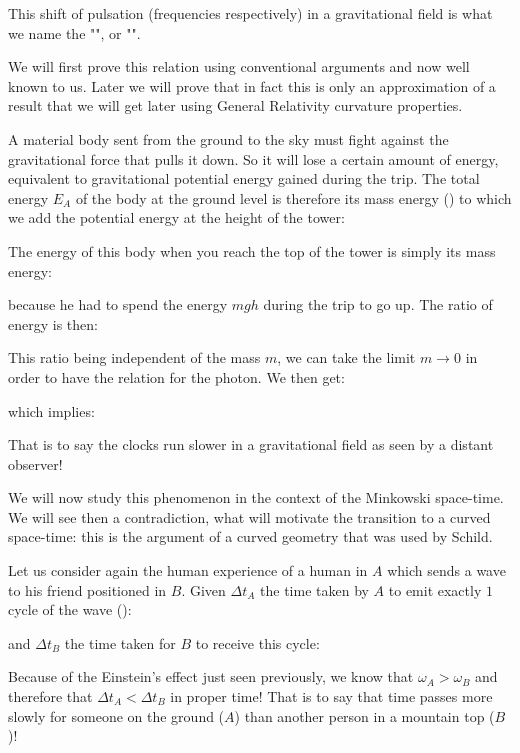 	This shift of pulsation (frequencies respectively) in a gravitational field is what we name the "", or "".
	
	We will first prove this relation using conventional arguments and now well known to us. Later we will prove that in fact this is only an approximation of a result that we will get later using General Relativity curvature properties.
	
	A material body sent from the ground to the sky must fight against the gravitational force that pulls it down. So it will lose a certain amount of energy, equivalent to gravitational potential energy gained during the trip. The total energy $E_A$ of the body at the ground level is therefore its mass energy () to which we add the potential energy at the height of the tower:
	
	The energy of this body when you reach the top of the tower is simply its mass energy:
	
	because he had to spend the energy $mgh$ during the trip to go up. The ratio of energy is then:
	
	This ratio being independent of the mass $m$, we can take the limit $m\rightarrow 0$ in order to have the relation for the photon. We then get:
	
	which implies:
	
	That is to say the clocks run slower in a gravitational field as seen by a distant observer!
	
	We will now study this phenomenon in the context of the Minkowski space-time. We will see then a contradiction, what will motivate the transition to a curved space-time: this is the argument of a curved geometry that was used by Schild.

	Let us consider again the human experience of a human in $A$ which sends a wave to his friend positioned in $B$. Given $\Delta t_A$ the time taken by $A$ to emit exactly $1$ cycle of the wave ():
	
	and $\Delta t_B$ the time taken for $B$ to receive this cycle:
	
	Because of the Einstein's effect just seen previously, we know that $\omega_A>\omega_B$ and therefore that $\Delta t_A<\Delta t_B$ in proper time! That is to say that time passes more slowly for someone on the ground ($A$) than another person in a mountain top ($B$)!

